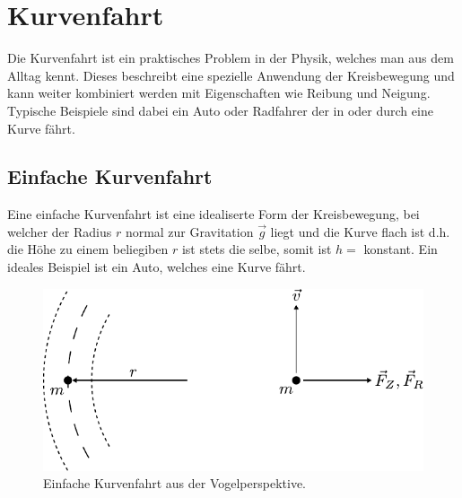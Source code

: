 



\chapter{Kurvenfahrt}

Die Kurvenfahrt ist ein praktisches Problem in der Physik, welches man
aus dem Alltag kennt. Dieses beschreibt eine spezielle Anwendung der
Kreisbewegung und kann weiter kombiniert werden mit Eigenschaften wie
Reibung und Neigung. Typische Beispiele sind dabei ein Auto oder 
Radfahrer der in oder durch eine Kurve fährt.

\newpage
\section{Einfache Kurvenfahrt}
Eine einfache Kurvenfahrt ist eine idealiserte Form der Kreisbewegung,
bei welcher der Radius $r$ normal zur Gravitation $\vec{g}$ liegt und
die Kurve flach ist d.h. die Höhe zu einem beliegiben $r$ ist stets die
selbe, somit ist $h=$ konstant. 
Ein ideales Beispiel ist ein Auto, welches eine Kurve fährt.

\begin{figure}[h!]
	\centering
	\includegraphics[scale=0.8]{kurve3.pdf}
	\caption{Einfache Kurvenfahrt aus der Vogelperspektive.}
	\label{fig:kurvenfahrt}
\end{figure}

